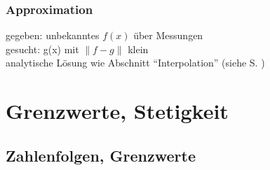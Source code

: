\subsubsection*{Approximation}
gegeben: unbekanntes $f(x)$ über Messungen \\
gesucht: g(x) mit $\left\| f - g \right\|$ klein \\
analytische Lösung wie Abschnitt "`Interpolation"' (siehe S. \pageref{interpolation})

\section{Grenzwerte, Stetigkeit}

\subsection{Zahlenfolgen, Grenzwerte}


